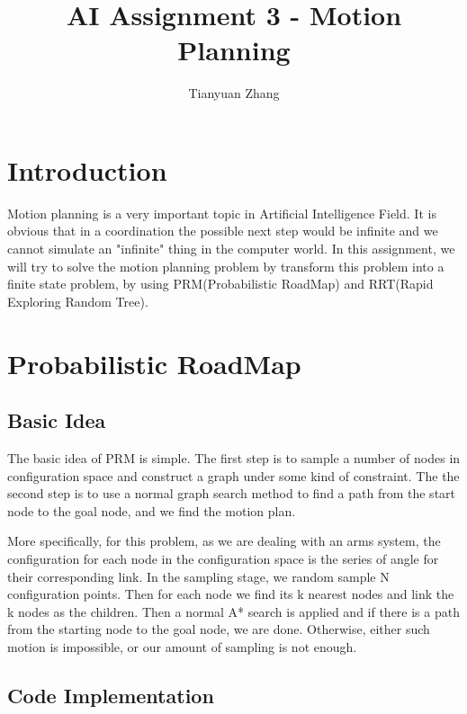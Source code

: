 \documentclass{article}
\title{AI Assignment 3 - Motion Planning}
\author{Tianyuan Zhang}
\begin{document}
\maketitle

\section{Introduction}
Motion planning is a very important topic in Artificial Intelligence Field. It is obvious that in a coordination the possible next step would be infinite and we cannot simulate an "infinite" thing in the computer world. In this assignment, we will try to solve the motion planning problem by transform this problem into a finite state problem, by using PRM(Probabilistic RoadMap) and RRT(Rapid Exploring Random Tree).

\section{Probabilistic RoadMap}
\subsection{Basic Idea}
The basic idea of PRM is simple. The first step is to sample a number of nodes in configuration space and construct a graph under some kind of constraint. The the second step is to use a normal graph search method to find a path from the start node to the goal node, and we find the motion plan.

More specifically, for this problem, as we are dealing with an arms system, the configuration for each node in the configuration space is the series of angle for their corresponding link. In the sampling stage, we random sample N configuration points. Then for each node we find its k nearest nodes and link the k nodes as the children. Then a normal A* search is applied and if there is a path from the starting node to the goal node, we are done. Otherwise, either such motion is impossible, or our amount of sampling is not enough.

\subsection{Code Implementation}
\end{document}
